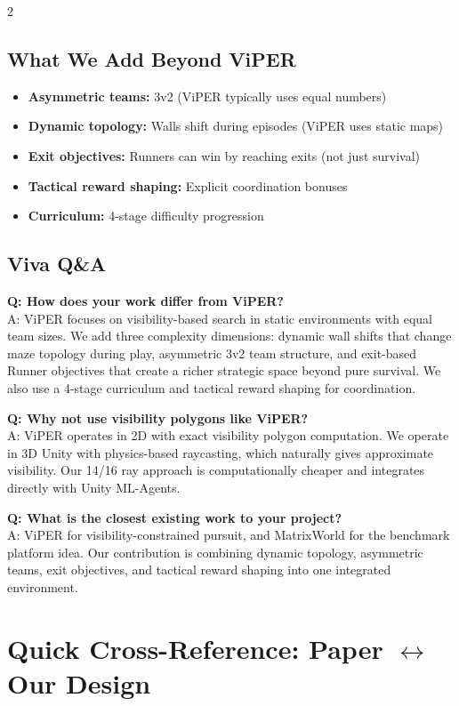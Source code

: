 \documentclass[10pt,a4paper]{article}
\begin{document}
\begin{multicols}{2}
\subsection{What We Add Beyond ViPER}
\begin{itemize}
\item \textbf{Asymmetric teams:} 3v2 (ViPER typically uses equal numbers)
\item \textbf{Dynamic topology:} Walls shift during episodes (ViPER uses static maps)
\item \textbf{Exit objectives:} Runners can win by reaching exits (not just survival)
\item \textbf{Tactical reward shaping:} Explicit coordination bonuses
\item \textbf{Curriculum:} 4-stage difficulty progression
\end{itemize}

\subsection{Viva Q\&A}

\textbf{Q: How does your work differ from ViPER?} \\
A: ViPER focuses on visibility-based search in static environments with equal team sizes. We add three complexity dimensions: dynamic wall shifts that change maze topology during play, asymmetric 3v2 team structure, and exit-based Runner objectives that create a richer strategic space beyond pure survival. We also use a 4-stage curriculum and tactical reward shaping for coordination.

\textbf{Q: Why not use visibility polygons like ViPER?} \\
A: ViPER operates in 2D with exact visibility polygon computation. We operate in 3D Unity with physics-based raycasting, which naturally gives approximate visibility. Our 14/16 ray approach is computationally cheaper and integrates directly with Unity ML-Agents.

\textbf{Q: What is the closest existing work to your project?} \\
A: ViPER for visibility-constrained pursuit, and MatrixWorld for the benchmark platform idea. Our contribution is combining dynamic topology, asymmetric teams, exit objectives, and tactical reward shaping into one integrated environment.

\section{Quick Cross-Reference: Paper $\leftrightarrow$ Our Design}


\end{multicols}
\end{document}
